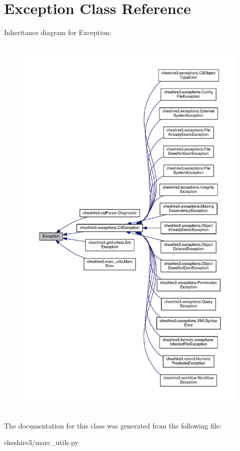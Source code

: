 \hypertarget{class_exception}{\section{Exception Class Reference}
\label{class_exception}
}


Inheritance diagram for Exception\-:
\nopagebreak
\begin{figure}[H]
\begin{center}
\leavevmode
\includegraphics[height=550pt]{class_exception__inherit__graph}
\end{center}
\end{figure}


The documentation for this class was generated from the following file\-:\begin{DoxyCompactItemize}
\item 
cheshire3/marc\-\_\-utils.\-py\end{DoxyCompactItemize}
